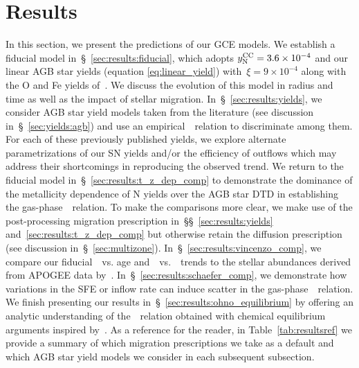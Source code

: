 \documentclass[ms.tex]{subfiles}
\begin{document}
\section{Results}
\label{sec:results}

In this section, we present the predictions of our GCE models.
We establish a fiducial model in~\S~\ref{sec:results:fiducial}, which adopts
$y_\text{N}^\text{CC} = 3.6\times10^{-4}$ and our linear AGB star yields (equation
\ref{eq:linear_yield}) with~$\xi = 9\times10^{-4}$ along with the O and Fe
yields of~\citet[see discussion in~\S~\ref{sec:yields}]{Johnson2021}.
We discuss the evolution of this model in radius and time as well as the impact
of stellar migration.
In~\S~\ref{sec:results:yields}, we consider AGB star yield models taken from
the literature (see discussion in~\S~\ref{sec:yields:agb}) and use an
empirical~\ohno~relation to discriminate among them.
For each of these previously published yields, we explore alternate
parametrizations of our SN yields and/or the efficiency of outflows which may
address their shortcomings in reproducing the observed trend.
We return to the fiducial model in~\S~\ref{sec:results:t_z_dep_comp} to
demonstrate the dominance of the metallicity dependence of N yields over the
AGB star DTD in establishing the gas-phase~\ohno~relation.
To make the comparisons more clear, we make use of the post-processing
migration prescription in~\S\S~\ref{sec:results:yields}
and~\ref{sec:results:t_z_dep_comp} but otherwise retain the diffusion
prescription (see discussion in~\S~\ref{sec:multizone}).
In~\S~\ref{sec:results:vincenzo_comp}, we compare our fiducial~\no~vs. age
and~\no~vs.~\ofe~trends to the stellar abundances derived from APOGEE data
by~\citet{Vincenzo2021}.
In~\S~\ref{sec:results:schaefer_comp}, we demonstrate how variations in the
SFE or inflow rate can induce scatter in the gas-phase~\ohno~relation.
We finish presenting our results in~\S~\ref{sec:results:ohno_equilibrium} by
offering an analytic understanding of the~\ohno~relation obtained with
chemical equilibrium arguments inspired by~\citet{Weinberg2017}.
As a reference for the reader, in Table~\ref{tab:resultsref} we provide a
summary of which migration prescriptions we take as a default and which AGB
star yield models we consider in each subsequent subsection.
\end{document}
